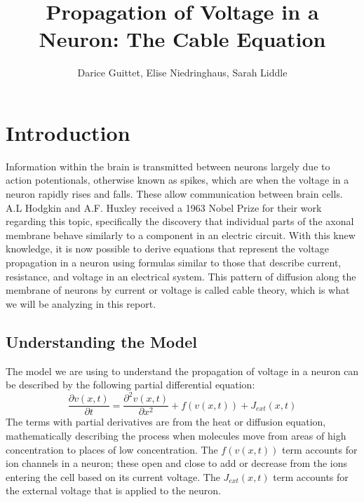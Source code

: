 \documentclass[12pt]{article}
\title{Propagation of Voltage in a Neuron: The Cable Equation}
\author{Darice Guittet, Elise Niedringhaus, Sarah Liddle}
\begin{document}
\maketitle
\section{Introduction}

Information within the brain is transmitted between neurons largely due to action potentionals, otherwise known as spikes, which are when the voltage in a neuron rapidly rises and falls. These allow communication between brain cells. A.L Hodgkin and A.F. Huxley received a 1963 Nobel Prize for their work regarding this topic, specifically the discovery that individual parts of the axonal membrane behave similarly to a component in an electric circuit. With this knew knowledge, it is now possible to derive equations that represent the voltage propagation in a neuron using formulas similar to those that describe current, resistance, and voltage in an electrical system. This pattern of diffusion along the membrane of neurons by current or voltage is called cable theory, which is what we will be analyzing in this report.

\subsection{Understanding the Model}
The model we are using to understand the propagation of voltage in a neuron can be described by the following partial differential equation:
\begin{equation} \label{1}
\frac{\partial{v(x,t)}}{\partial{t}}=\frac{\partial^2{v(x,t)}}{\partial{x}^2}+f(v(x,t))+J_{ext}(x,t)
\end {equation}
The terms with partial derivatives are from the heat or diffusion equation, mathematically describing the process when molecules move from areas of high concentration to places of low concentration. The $f(v(x,t))$ term accounts for ion channels in a neuron; these open and close to add or decrease from the ions entering the cell based on its current voltage. The $J_{ext}(x,t)$ term accounts for the external voltage that is applied to the neuron. 
\end{document}
